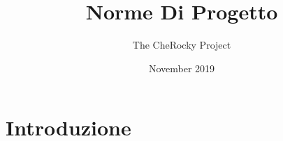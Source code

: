 \documentclass{article}
\title{Norme Di Progetto}
\author{The CheRocky Project}
\date{November 2019}
\begin{document}
\maketitle

\section{Introduzione}
\end{document}

